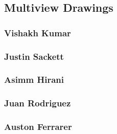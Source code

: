 \subsection{Multiview Drawings}

\subsubsection{Vishakh Kumar}

\subsubsection{Justin Sackett}

\subsubsection{Asimm Hirani}

\subsubsection{Juan Rodriguez}

\subsubsection{Auston Ferrarer}

